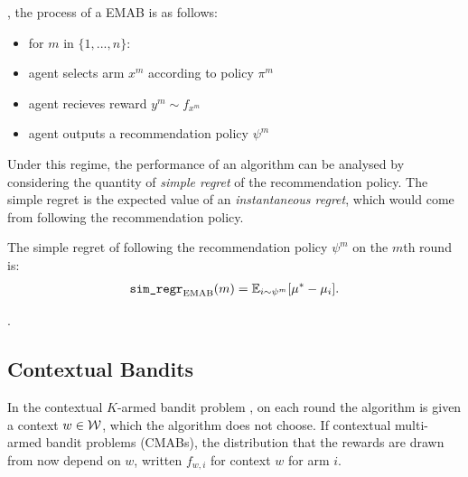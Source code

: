         , the process of a EMAB is as follows:
        \begin{itemize}
            \item for $m$ in $\{1,...,n\}$:
            \item agent selects arm $x^m$ according to policy $\pi^m$
            \item agent recieves reward $y^m \sim f_{x^m}$
            \item agent outputs a recommendation policy $\psi^m$
        \end{itemize}

        Under this regime, the performance of an algorithm can be analysed by considering the quantity of \textit{simple regret} of the recommendation policy. The simple regret is the expected value of an \textit{instantaneous regret},  which would come from following the recommendation policy.

        \begin{defn}
            The \textnormal{simple regret} of following the recommendation policy $\psi^m$ on the $m$th round is:
            \begin{align}
                {\textnormal{\texttt{sim\_regr}}}_{{\textnormal{EMAB}}}(m) = \mathbb{E}_{i\sim\psi^m}[\mu^* - \mu_i].
            \end{align}
        \end{defn}


        .

    
    \subsection{Contextual Bandits}
    \label{sec:2-1-2-contextual-mab}


        In the contextual $K$-armed bandit problem , on each round the algorithm is given a context $w\in \mathcal{W}$, which the algorithm does not choose. If contextual multi-armed bandit problems (CMABs), the distribution that the rewards are drawn from now depend on $w$, written $f_{w,i}$ for context $w$ for arm $i$. 



